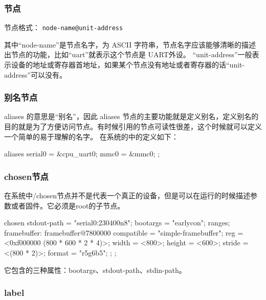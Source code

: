 \subsubsection{节点}\label{sec:13-operating-system-014}

节点格式： \texttt{node-name@unit-address}

其中``node-name''是节点名字，为 ASCII 字符串，节点名字应该能够清晰的描述出节点的功能，比如``uart''就表示这个节点是 UART外设。
``unit-address''一般表示设备的地址或寄存器首地址，如果某个节点没有地址或者寄存器的话``unit-address''可以没有。

\subsubsection{别名节点}\label{sec:13-operating-system-015}

aliases 的意思是``别名''，因此 aliases 节点的主要功能就是定义别名，定义别名的目的就是为了方便访问节点。有时候引用的节点可读性很差，这个时候就可以定义一个简单的易于理解的名字。
在系统的中的定义如下：

\begin{CodeBlock}[language=BookDTS]
    aliases {
        serial0 = &cpu_uart0;
        mmc0 = &mmc0;
    };
\end{CodeBlock}

\subsubsection{chosen节点}\label{sec:13-operating-system-016}

在系统中/chosen节点并不是代表一个真正的设备，但是可以在运行的时候描述参数或者固件。它必须是root的子节点。

\begin{CodeBlock}[language=BookDTS]
    chosen {
        stdout-path = "serial0:230400n8";
        bootargs = "earlycon";
        ranges;
        framebuffer: framebuffer@7800000 {
            compatible = "simple-framebuffer";
            reg = <0xf000000 (800 * 600 * 2 * 4)>;
            width = <800>;
            height = <600>;
            stride = <(800 * 2)>;
            format = "r5g6b5";
        }; 
    };
\end{CodeBlock}

它包含的三种属性：bootargs、stdout-path、stdin-path。

\subsubsection{label}\label{sec:13-operating-system-017}

